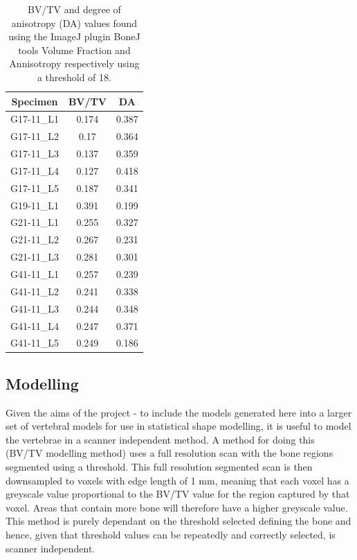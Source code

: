 \begin{table}[ht!]
	\caption{BV/TV and degree of anisotropy (DA) values found using the ImageJ
    plugin BoneJ tools Volume Fraction and Annisotropy respectively using a
    threshold of 18.}
	\label{tab:bv_tv_anis}
	\centering
	\begin{tabular}{c|c|c}
    Specimen                       & BV/TV & DA\\ \hline \hline
    G17-11\_L1  & 0.174 & 0.387 \\
    G17-11\_L2  & 0.17  & 0.364\\
    G17-11\_L3  & 0.137 & 0.359\\
    G17-11\_L4  & 0.127 & 0.418\\
    G17-11\_L5  & 0.187 & 0.341\\
    G19-11\_L1  & 0.391 & 0.199\\
    G21-11\_L1  & 0.255 & 0.327\\
    G21-11\_L2  & 0.267 & 0.231\\
    G21-11\_L3  & 0.281 & 0.301\\
    G41-11\_L1  & 0.257 & 0.239\\
    G41-11\_L2  & 0.241 & 0.338\\
    G41-11\_L3  & 0.244 & 0.348\\
    G41-11\_L4  & 0.247 & 0.371\\
    G41-11\_L5  & 0.249 & 0.186\\
    \hline
	\end{tabular}
\end{table}




\subsection{Modelling}

Given the aims of the project - to include the models generated here into a
larger set of vertebral models for use in statistical shape modelling, it is
useful to model the vertebrae in a scanner independent method. A method for
doing this (BV/TV modelling method) uses a full resolution scan with the bone
regions segmented using a threshold. This full resolution segmented scan is then
downsampled to voxels with edge length of 1 mm, meaning that each voxel has a
greyscale value proportional to the BV/TV value for the region captured by that
voxel. Areas that contain more bone will therefore have a higher greyscale
value. This method is purely dependant on the threshold selected defining the
bone and hence, given that threshold values can be repeatedly and correctly
selected, is scanner independent.

